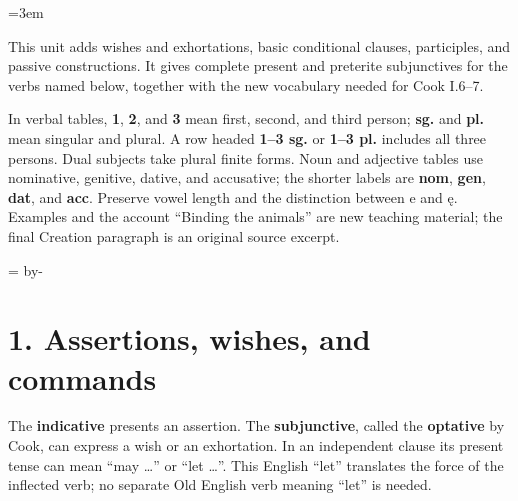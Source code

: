 \BookRecto
\begingroup
\renewcommand{\runningtitle}{Unit 7. Subjunctive and passive}
\emergencystretch=3em
\newcommand{\itempara}[2]{\par\addvspace{3pt}\noindent\hangindent=1.8em\hangafter=1\makebox[1.8em][l]{#1.}#2\par}
\newcommand{\reserve}[1]{\par\penalty-100\begingroup\dimen0=\pagegoal\advance\dimen0 by-\pagetotal\ifdim\dimen0<#1\newpage\fi\endgroup}

\raggedright
{}

This unit adds wishes and exhortations, basic conditional clauses, participles, and passive constructions. It gives complete present and preterite subjunctives for the verbs named below, together with the new vocabulary needed for Cook I.6–7.

In verbal tables, \textbf{1}, \textbf{2}, and \textbf{3} mean first, second, and third person; \textbf{sg.} and \textbf{pl.} mean singular and plural. A row headed \textbf{1–3 sg.} or \textbf{1–3 pl.} includes all three persons. Dual subjects take plural finite forms. Noun and adjective tables use nominative, genitive, dative, and accusative; the shorter labels are \textbf{nom}, \textbf{gen}, \textbf{dat}, and \textbf{acc}. Preserve vowel length and the distinction between e and ę. Examples and the account “Binding the animals” are new teaching material; the final Creation paragraph is an original source excerpt.

\reserve{7\baselineskip}
\section*{1. Assertions, wishes, and commands}

The \textbf{indicative} presents an assertion. The \textbf{subjunctive}, called the \textbf{optative} by Cook, can express a wish or an exhortation. In an independent clause its present tense can mean “may …” or “let …”. This English “let” translates the force of the inflected verb; no separate Old English verb meaning “let” is needed.

